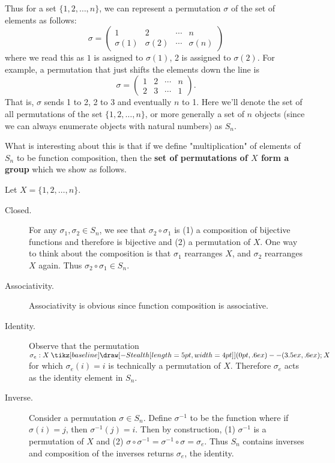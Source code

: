 \documentclass[12pt,letterpaper]{algebra_book}
\renewcommand{\to}{\mathbin{\tikz[baseline] \draw[-{Stealth[length=5pt,width=4pt]}] (0pt,.6ex) -- (3.5ex,.6ex);}}
\theoremstyle{definition}
\begin{document}
    Thus for a set $\{1, 2, \dots, n\}$, we can represent a
    permutation $\sigma$ of the set of elements as follows:
    \[
       \sigma =  
       \begin{pmatrix}
            1 & 2 & \cdots & n\\
            \sigma(1) & \sigma(2) & \cdots & \sigma(n)
         \end{pmatrix}
    \]
    where we read this as $1$ is assigned to $\sigma(1)$, 2 is
    assigned to $\sigma(2)$. For example, a permutation that just
    shifts the elements down the line is 
    \[
        \sigma = 
        \begin{pmatrix}
            1 & 2 & \cdots & n\\
            2 & 3 & \cdots & 1
         \end{pmatrix}.
    \]
    That is, $\sigma$ sends 1 to 2, 2 to 3 and eventually $n$ to 1. 
    Here we'll denote the set of all permutations of the set $\{1, 2,
    \dots, n\}$, or more generally a set of $n$ objects (since we can
    always enumerate objects with natural numbers) as $S_n$.
    
    \textcolor{NavyBlue}{What is interesting about this is that if we define
    "multiplication" of elements of $S_n$ to be function composition,
    then the 
     \textbf{set of permutations
    of $X$ form a group} which we show as follows.}
    
    Let $X = \{1, 2, \dots, n\}$. 
    \begin{description}
        \item[Closed.]
        For any $\sigma_1, \sigma_2 \in S_n$, we see that $\sigma_2
        \circ \sigma_1$ is (1) a composition of bijective functions
        and therefore is bijective and (2) a permutation of $X$. One
        way to think about the composition is that $\sigma_1$
        rearranges $X$, and
        $\sigma_2$ rearranges $X$ again. Thus $\sigma_2 \circ \sigma_1
        \in S_n$. 

        \item[Associativity.]
        Associativity is obvious since function composition is
        associative. 

        \item[Identity.]
        Observe that the permutation $\sigma_e: X \to X$ for which 
        $\sigma_e(i) = i$ is technically a permutation of $X$.
        Therefore $\sigma_e$ acts as the identity element in $S_n$. 

        \item[Inverse.]
        Consider a permutation $\sigma \in S_n$. Define $\sigma^{-1}$
        to be the function where if $\sigma(i) = j$, then
        $\sigma^{-1}(j) = i$. Then by construction, (1) $\sigma^{-1}$ is a permutation
        of $X$ and (2) $\sigma \circ \sigma^{-1} = \sigma^{-1} \circ
        \sigma = \sigma_e$. Thus $S_n$ contains inverses and
        composition of the inverses returns $\sigma_e$, the identity.
    \end{description}
\end{document}
